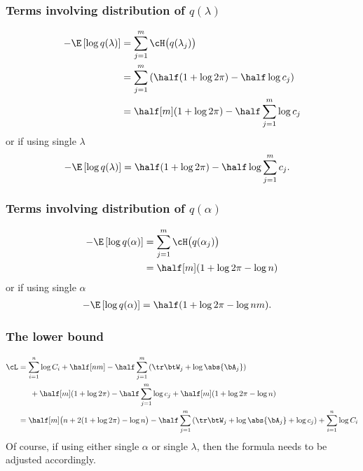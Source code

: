 \documentclass[]{article}
\begin{document}
\subsubsection{Terms involving distribution of $q(\lambda)$}

\begin{align*}
  -\E\left[ \log q(\lambda) \right] 
  &= \sum_{j=1}^m \cH\big(q(\lambda_j)\big)  \\
  &= \sum_{j=1}^m \left( \half (1 + \log 2\pi) - \half \log c_j \right) \\
  &= \half[m](1 + \log 2\pi) - \half \sum_{j=1}^m \log c_j
\end{align*}
or if using single $\lambda$
\begin{align*}
  -\E\left[ \log q(\lambda) \right] 
  &= \half(1 + \log 2\pi) - \half  \log  \sum_{j=1}^m c_j .
\end{align*}

\subsubsection{Terms involving distribution of $q(\alpha)$}

\begin{align*}
  -\E\left[ \log q(\alpha) \right] 
  &= \sum_{j=1}^m \cH\big(q(\alpha_j)\big) \\
  &= \half[m] (1 + \log 2\pi - \log n)
\end{align*}
or if using single $\alpha$
\begin{align*}
  -\E\left[ \log q(\alpha) \right] 
  &= \half (1 + \log 2\pi - \log nm).
\end{align*}

\subsubsection{The lower bound}

\begin{align*}
  \cL 
  &= \sum_{i=1}^n \log C_i + \half[nm] - \half \sum_{j=1}^m \left( \tr \btW_j + \log \abs{\bA_j} \right) \\
  &\phantom{==} + \half[m](1 + \log 2\pi) - \half \sum_{j=1}^m \log c_j + \half[m] (1 + \log 2\pi - \log n) \\
  &= \half[m]\big(n + 2(1 + \log 2\pi) - \log n \big)
  - \half \sum_{j=1}^m \left( \tr \btW_j + \log \abs{\bA_j} + \log c_j \right) + \sum_{i=1}^n \log C_i
\end{align*}
Of course, if using either single $\alpha$ or single $\lambda$, then the formula needs to be adjusted accordingly.
\end{document}
